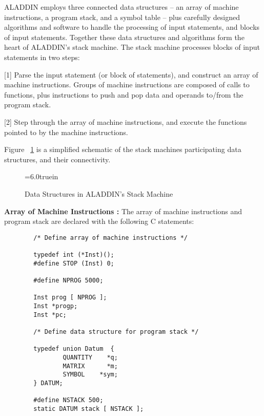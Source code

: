 \vspace{0.15 in}
\noindent\hspace{0.50 in}
ALADDIN employs three connected data structures -- an array of
machine instructions, a program stack, and a symbol table --
plus carefully designed algorithms and software to handle the
processing of input statements, and blocks of input statements.
Together these data structures and algorithms
form the heart of ALADDIN's stack machine.
The stack machine processes blocks of input statements in two steps:

\begin{description}
\item{[1]}
Parse the input statement (or block of statements),
and construct an array of machine instructions.
Groups of machine instructions are composed of calls to functions,
plus instructions to push and pop data and operands to/from the program stack.
\item{[2]}
Step through the array of machine instructions,
and execute the functions pointed to by the machine instructions.
\end{description}

\vspace{0.05 in}\noindent
Figure ~\ref{fig: stack_machine} is a simplified schematic of the
stack machines participating data structures, and their connectivity. 

\begin{figure}[t]
\epsfxsize=6.0truein
\centerline{}
\caption{Data Structures in ALADDIN's Stack Machine}
\label{fig: stack_machine}
\end{figure}

\vspace{0.15 in}\noindent
{\bf Array of Machine Instructions :}
The array of machine instructions and program stack are
declared with the following C statements:

\begin{footnotesize}
\begin{verbatim}
        /* Define array of machine instructions */

        typedef int (*Inst)();
        #define STOP (Inst) 0;

        #define NPROG 5000;

        Inst prog [ NPROG ];
        Inst *progp;
        Inst *pc;

        /* Define data structure for program stack */

        typedef union Datum  {
                QUANTITY    *q;
                MATRIX      *m;
                SYMBOL    *sym;
        } DATUM;

        #define NSTACK 500;
        static DATUM stack [ NSTACK ];
\end{verbatim}
\end{footnotesize}


